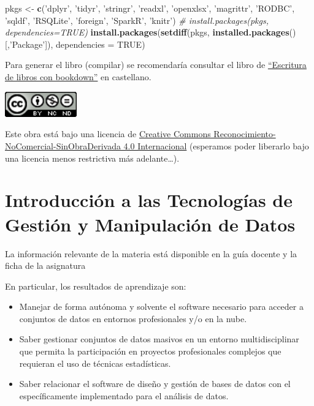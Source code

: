 \documentclass[]{book}
\newenvironment{Shaded}{\begin{snugshade}}{\end{snugshade}}
\newcommand{\KeywordTok}[1]{\textcolor[rgb]{0.13,0.29,0.53}{\textbf{#1}}}
\newcommand{\DataTypeTok}[1]{\textcolor[rgb]{0.13,0.29,0.53}{#1}}
\newcommand{\StringTok}[1]{\textcolor[rgb]{0.31,0.60,0.02}{#1}}
\newcommand{\CommentTok}[1]{\textcolor[rgb]{0.56,0.35,0.01}{\textit{#1}}}
\newcommand{\OtherTok}[1]{\textcolor[rgb]{0.56,0.35,0.01}{#1}}
\newcommand{\NormalTok}[1]{#1}
\begin{document}
\begin{Shaded}
\begin{Highlighting}[]
\NormalTok{pkgs <-}\StringTok{ }\KeywordTok{c}\NormalTok{(}\StringTok{'dplyr'}\NormalTok{, }\StringTok{'tidyr'}\NormalTok{, }\StringTok{'stringr'}\NormalTok{, }\StringTok{'readxl'}\NormalTok{, }\StringTok{'openxlsx'}\NormalTok{, }\StringTok{'magrittr'}\NormalTok{, }
          \StringTok{'RODBC'}\NormalTok{, }\StringTok{'sqldf'}\NormalTok{, }\StringTok{'RSQLite'}\NormalTok{, }\StringTok{'foreign'}\NormalTok{, }\StringTok{'SparkR'}\NormalTok{, }\StringTok{'knitr'}\NormalTok{)}
\CommentTok{# install.packages(pkgs, dependencies=TRUE)}
\KeywordTok{install.packages}\NormalTok{(}\KeywordTok{setdiff}\NormalTok{(pkgs, }\KeywordTok{installed.packages}\NormalTok{()[,}\StringTok{'Package'}\NormalTok{]), }\DataTypeTok{dependencies =} \OtherTok{TRUE}\NormalTok{)}
\end{Highlighting}
\end{Shaded}

Para generar el libro (compilar) se recomendaría consultar el libro de
\href{https://rubenfcasal.github.io/bookdown_intro}{``Escritura de
libros con bookdown''} en castellano.

\includegraphics[width=1.22in]{images/by-nc-nd-88x31}

Este obra está bajo una licencia de
\href{https://creativecommons.org/licenses/by-nc-nd/4.0/deed.es_ES}{Creative
Commons Reconocimiento-NoComercial-SinObraDerivada 4.0 Internacional}
(esperamos poder liberarlo bajo una licencia menos restrictiva más
adelante\ldots{}).

\chapter{Introducción a las Tecnologías de Gestión y Manipulación de
Datos}\label{introduccion-a-las-tecnologias-de-gestion-y-manipulacion-de-datos}

La información relevante de la materia está disponible en la guía
docente y la ficha de la asignatura

En particular, los resultados de aprendizaje son:

\begin{itemize}
\item
  Manejar de forma autónoma y solvente el software necesario para
  acceder a conjuntos de datos en entornos profesionales y/o en la nube.
\item
  Saber gestionar conjuntos de datos masivos en un entorno
  multidisciplinar que permita la participación en proyectos
  profesionales complejos que requieran el uso de técnicas estadísticas.
\item
  Saber relacionar el software de diseño y gestión de bases de datos con
  el específicamente implementado para el análisis de datos.
\end{itemize}
\end{document}
